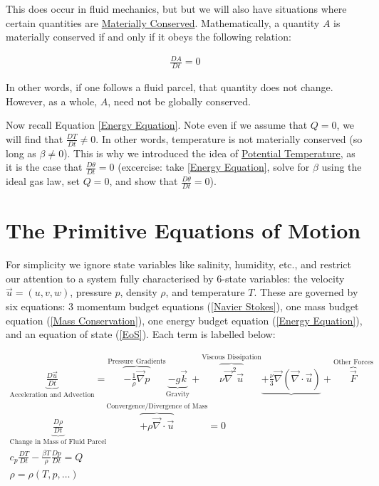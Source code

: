 This does occur in fluid mechanics, but but we will also have situations where certain quantities are \hyperref[Material Conservation]{Materially Conserved}. Mathematically, a quantity $A$ is materially conserved if and only if it obeys the following relation:

\begin{align}\label{Material Conservation}
    \frac{D A}{Dt }=0
\end{align}

In other words, if one follows a fluid parcel, that quantity does not change. However, as a whole, $A$, need not be globally conserved. 

Now recall Equation \ref{Energy Equation}. Note even if we assume that $Q=0$, we will find that $\frac{DT}{Dt}\neq 0$. In other words, temperature is not materially conserved (so long as $\beta\neq0$). This is why we introduced the idea of \hyperref[Potential Temperature]{Potential Temperature}, as it is the case that $\frac{D\theta}{Dt}=0$ (excercise: take \ref{Energy Equation}, solve for $\beta$ using the ideal gas law, set $Q=0$, and show that $\frac{D\theta}{Dt}=0$).

\section{The Primitive Equations of Motion}

For simplicity we ignore state variables like salinity, humidity, etc., and restrict our attention to a system fully characterised by 6-state variables: the velocity $\vec{u}=(u,v,w)$, pressure $p$, density $\rho$, and temperature $T$. These are governed by six equations: 3 momentum budget equations (\ref{Navier Stokes}), one mass budget equation (\ref{Mass Conservation}), one energy budget equation (\ref{Energy Equation}), and an equation of state (\ref{EoS}). Each term is labelled below:

\begin{gather}
    \underbrace{\frac{D\vec{u}}{Dt}}_{\text{Acceleration and Advection}}
    =\overbrace{-\frac{1}{\rho}\vec{\nabla}p}^\text{Pressure Gradients}\underbrace{-g\vec{k}}_\text{Gravity}+\overbrace{\nu\vec{\nabla}^2\vec{u}}^\text{Viscous Dissipation}\underbrace{+\frac{\nu}{3}\vec{\nabla}(\vec{\nabla}\cdot\vec{u})}_\text{}+\overbrace{\vec{F}}^\text{Other Forces}\label{Navier Stokes}
    \\
    \underbrace{\frac{D\rho}{Dt}}_\text{Change in Mass of Fluid Parcel}\overbrace{+\rho\vec{\nabla}\cdot\vec{u}}^\text{Convergence/Divergence of Mass}=0
    \label{Mass Conservation}
    \\
    c_p\frac{DT}{Dt}-\frac{\beta T}{\rho}\frac{Dp}{Dt}=Q
    \label{Energy Equation}
    \\
     \rho=\rho(T,p,\ldots)
    \label{EoS}
\end{gather}

